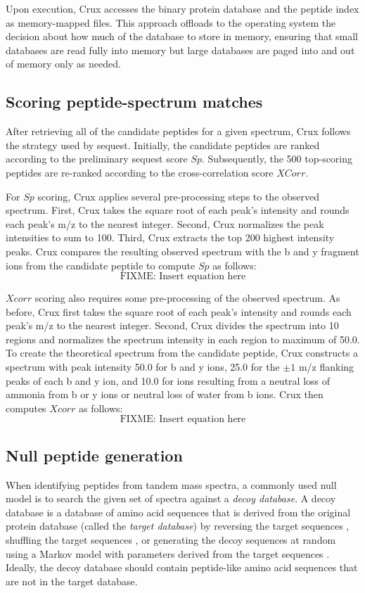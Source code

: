 \documentclass{bioinfo}
\renewcommand{\cite}{\citep}
\begin{document}
Upon execution, Crux accesses the binary protein database and the
peptide index as memory-mapped files.  This approach offloads to the
operating system the decision about how much of the database to store
in memory, ensuring that small databases are read fully into memory
but large databases are paged into and out of memory only as needed.

\subsection{Scoring peptide-spectrum matches}

After retrieving all of the candidate peptides for a given spectrum,
Crux follows the strategy used by {\sc sequest}.  Initially, the candidate
peptides are ranked according to the preliminary {\sc sequest} score $Sp$.
Subsequently, the 500 top-scoring peptides are re-ranked according to
the cross-correlation score $XCorr$.

For $Sp$ scoring, Crux applies several pre-processing steps to the
observed spectrum.  First, Crux takes the square root of each peak's
intensity and rounds each peak's m/z to the nearest integer.  Second,
Crux normalizes the peak intensities to sum to 100.  Third, Crux
extracts the top 200 highest intensity peaks.  Crux compares the
resulting observed spectrum with the b and y fragment ions from the
candidate peptide to compute $Sp$ as follows:
\[
\mbox{FIXME: Insert equation here}
\]

$Xcorr$ scoring also requires some pre-processing of the observed
spectrum.  As before, Crux first takes the square root of each peak's
intensity and rounds each peak's m/z to the nearest integer.  Second,
Crux divides the spectrum into 10 regions and normalizes the spectrum
intensity in each region to maximum of 50.0. To create the theoretical
spectrum from the candidate peptide, Crux constructs a spectrum with
peak intensity 50.0 for b and y ions, 25.0 for the $\pm 1$ m/z flanking
peaks of each b and y ion, and 10.0 for ions resulting from a neutral
loss of ammonia from b or y ions or neutral loss of water from b ions.
Crux then computes $Xcorr$ as follows:
\[
\mbox{FIXME: Insert equation here}
\]

\subsection{Null peptide generation}

When identifying peptides from tandem mass spectra, a commonly used
null model is to search the given set of spectra against a {\em decoy
database}.  A decoy database is a database of amino acid sequences
that is derived from the original protein database (called the {\em
target database}) by reversing the target sequences
\cite{moore:qscore}, shuffling the target sequences
\cite{klammer:effects}, or generating the decoy sequences at random
using a Markov model with parameters derived from the target sequences
\cite{colinge:olav}.  Ideally, the decoy database should contain
peptide-like amino acid sequences that are not in the target database.
\end{document}
